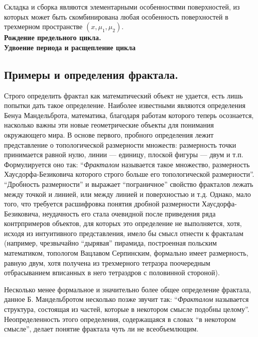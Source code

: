 Складка и сборка являются элементарными особенностями поверхностей, из которых может быть скомбинирована любая особенность поверхностей в трехмерном пространстве $(x, \mu_{1}, \mu_{2})$.\\
\textbf{Рождение предельного цикла.}\\
\textbf{Удвоение периода и расщепление цикла}\\
\subsection{Примеры и определения фрактала.}
Строго определить фрактал как математический объект не удается, есть лишь попытки дать такое определение. Наиболее известными являются определения Бенуа Мандельброта, математика, благодаря работам которого теперь осознается, насколько важны эти новые геометрические объекты для понимания окружающего мира. В основе первого, пробного определения лежит представление о топологической размерности множеств: размерность точки принимается равной нулю, линии --- единицу, плоской фигуры --- двум и т.п. Формулируется оно так: ``\textit{Фракталом} называется такое множество, размерность Хаусдорфа-Безиковича которого строго больше его топологической размерности''. ``Дробность размерности'' и выражает ``пограничное'' свойство фракталов лежать между точкой и линией, или между линией и поверхностью и т.д. Однако, мало того, что требуется расшифровка понятия дробной размерности Хаусдорфа-Безиковича, неудачность его стала очевидной после приведения ряда контрпримеров объектов, для которых это определение не выполняется, хотя, исходя из интуитивного представления, имело бы смысл отнести к фракталам (например, чрезвычайно ``дырявая'' пирамида, построенная польским математиком, топологом Вацлавом Серпинским, формально имеет размерность, равную двум, хотя получена из трехмерного тетраэра поочередным отбрасыванием вписанных в него тетраэдров с половинной стороной).

Несколько менее формальное и значительно более общее определение фрактала, данное Б. Мандельбротом несколько позже звучит так: ``\textit{Фракталом} называется структура, состоящая из частей, которые в некотором смысле подобны целому''. Неопределенность этого определения, содержащаяся в словах ``в некотором смысле'', делает понятие фрактала чуть ли не всеобъемлющим.

